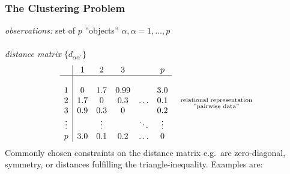\subsubsection{The Clustering Problem}
\emph{observations:} set of $p$ ''objects'' $\alpha, \alpha = 1, \ldots, p$ 
\\\\
\emph{distance matrix} $\big\{ d_{\alpha \alpha^{'}} \big\}$
\[ \begin{array}{ll}
	\begin{array}{c|ccccc}
	& 1 & 2 & 3 && p \\
	\hline \\
	1 & 0 & 1.7 & 0.99 && 3.0 \\
	2 & 1.7 & 0 & 0.3 & \ldots & 0.1 \\
	3 & 0.9 & 0.3 & 0 && 0.2 \\
	\vdots && \vdots && \ddots & \vdots \\
	p & 3.0 & 0.1 & 0.2 & \ldots & 0
	\end{array}
	& \substack{	\text{relational representation} \\
			\text{''pairwise data''}}
\end{array} \]
Commonly chosen constraints on the distance matrix e.g.\ are zero-diagonal, symmetry, or distances fulfilling the triangle-inequality. Examples are:  
